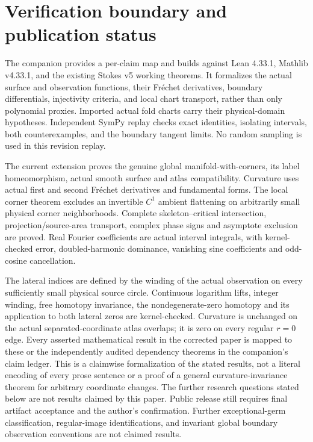 \documentclass[11pt,a4paper]{article}
\theoremstyle{definition}\newtheorem{definition}[theorem]{Definition}
\theoremstyle{remark}\newtheorem{remark}[theorem]{Remark}
\begin{document}
\section{Verification boundary and publication status}
The companion provides a per-claim map and builds against Lean 4.33.1,
Mathlib v4.33.1, and the existing Stokes v5 working theorems. It formalizes
the actual surface and observation functions, their Fr\'echet derivatives,
boundary differentials, injectivity criteria, and local chart transport,
rather than only polynomial proxies. Imported actual fold charts carry
their physical-domain hypotheses. Independent SymPy replay checks exact
identities, isolating intervals, both counterexamples, and the boundary
tangent limits. No random sampling is used in this revision replay.

The current extension proves the genuine global manifold-with-corners,
its label homeomorphism, actual smooth surface and atlas compatibility.
Curvature uses actual first and second Fr\'echet derivatives and fundamental
forms. The local corner theorem excludes an invertible $C^1$ ambient
flattening on arbitrarily small physical corner neighborhoods. Complete
skeleton--critical intersection, projection/source-area transport, complex
phase signs and asymptote exclusion are proved. Real Fourier coefficients
are actual interval integrals, with kernel-checked error, doubled-harmonic
dominance, vanishing sine coefficients and odd-cosine cancellation.

The lateral indices are defined by the winding of the actual observation
on every sufficiently small physical source circle. Continuous logarithm
lifts, integer winding, free homotopy invariance, the nondegenerate-zero
homotopy and its application to both lateral zeros are kernel-checked.
Curvature is unchanged on the actual separated-coordinate atlas overlaps;
it is zero on every regular $r=0$ edge. Every asserted mathematical result
in the corrected paper is mapped to these or the independently audited
dependency theorems in the companion's claim ledger. This is a claimwise
formalization of the stated results, not a literal encoding of every prose
sentence or a proof of a general curvature-invariance theorem for arbitrary
coordinate changes. The further research questions stated below are not
results claimed by this paper. Public release still requires final artifact
acceptance and the author's confirmation.
Further exceptional-germ classification, regular-image identifications, and invariant
global boundary observation conventions are not claimed results.
\end{document}
